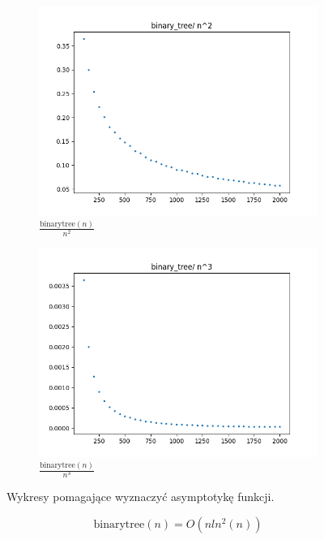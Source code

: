 \documentclass{article}
\begin{document}
\begin{figure}[H]
\begin{subfigure}{.475\textwidth}
    \centering
    \includegraphics[width=\textwidth]{binary_tree_nn.png}
    \caption{\( \frac{\text{binarytree}(n)}{n^2} \)}
    \label{fig:binary_tree_nn}
  \end{subfigure}%
  \begin{subfigure}{.475\textwidth}
    \centering
    \includegraphics[width=\textwidth]{binary_tree_nnn.png}
    \caption{\( \frac{\text{binarytree}(n)}{n^3} \)}
    \label{fig:binary_tree_nnn}
  \end{subfigure}%
  \caption{Wykresy pomagające wyznaczyć asymptotykę funkcji.}
  \label{fig:bn}
\end{figure}
\[\text{binarytree}(n)=O(nln^2(n))\]
\end{document}
